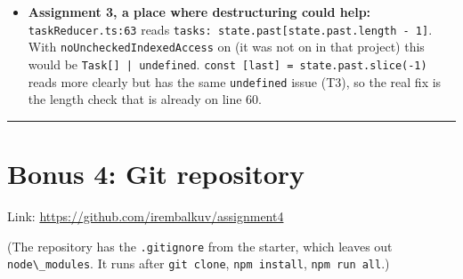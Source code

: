 \begin{itemize}
  \textbf{\passthrough{\lstinline!@types/react!} line 1430:} \passthrough{\lstinline!type PropsWithChildren<P = unknown> = P \& \{ children?: ReactNode | undefined \};!} This is where P7\textquotesingle s \passthrough{\lstinline!PropsWithChildren!} comes from. It is just an intersection, nothing magic.
\item
  \textbf{Assignment 3, a place where destructuring could help:} \passthrough{\lstinline!taskReducer.ts:63!} reads \passthrough{\lstinline!tasks: state.past[state.past.length - 1]!}. With \passthrough{\lstinline!noUncheckedIndexedAccess!} on (it was not on in that project) this would be \passthrough{\lstinline!Task[] | undefined!}. \passthrough{\lstinline!const [last] = state.past.slice(-1)!} reads more clearly but has the same \passthrough{\lstinline!undefined!} issue (T3), so the real fix is the length check that is already on line 60.
\end{itemize}

\begin{center}\rule{0.5\linewidth}{0.5pt}\end{center}

\hypertarget{bonus-4-git-repository}{%
\section{Bonus 4: Git repository}\label{bonus-4-git-repository}}

Link: \url{https://github.com/irembalkuv/assignment4}

(The repository has the \passthrough{\lstinline!.gitignore!} from the starter, which leaves out \passthrough{\lstinline!node\_modules!}. It runs after \passthrough{\lstinline!git clone!}, \passthrough{\lstinline!npm install!}, \passthrough{\lstinline!npm run all!}.)
